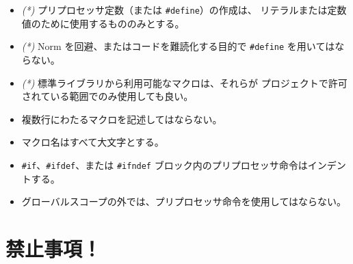 \documentclass{42-ja}
\begin{document}
        \begin{itemize}

            \item \textit{(*)} プリプロセッサ定数（または \texttt{\#define}）の作成は、
                リテラルまたは定数値のために使用するもののみとする。

            \item \textit{(*)} Norm を回避、またはコードを難読化する目的で
              \texttt{\#define} を用いてはならない。

            \item \textit{(*)} 標準ライブラリから利用可能なマクロは、それらが
                プロジェクトで許可されている範囲でのみ使用しても良い。

            \item 複数行にわたるマクロを記述してはならない。

            \item マクロ名はすべて大文字とする。

            \item \texttt{\#if}、\texttt{\#ifdef}、または \texttt{\#ifndef} 
                ブロック内のプリプロセッサ命令はインデントする。

            \item グローバルスコープの外では、プリプロセッサ命令を使用してはならない。

        \end{itemize}
        \newpage


    \section{禁止事項！}
\end{document}
